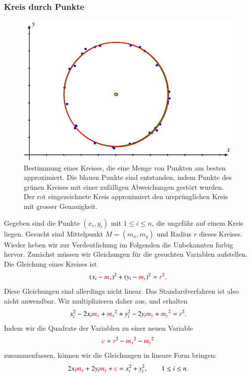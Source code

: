 \subsubsection{Kreis durch Punkte}
\begin{figure}
\centering
\includegraphics{4/images/kreis.pdf}
\caption{Bestimmung eines Kreises, die eine Menge von Punkten am besten
approximiert.
Die blauen Punkte sind entstanden, indem Punkte des grünen Kreises
mit einer zufälligen Abweichungen gestört wurden.
Der rot eingezeichnete Kreis approximiert den ursprünglichen
Kreis mit grosser Genauigkeit.
\label{skript:linreg-abb}}
\end{figure}
Gegeben sind die Punkte $(x_i,y_i)$ mit $1\le i\le n$, die ungefähr
auf einem Kreis liegen.
Gesucht sind Mittelpunkt $M=(m_x,m_y)$ und Radius $r$ dieses Kreises.
Wieder heben wir zur Verdeutlichung im Folgenden die Unbekannten farbig
hervor.
Zunächst müssen wir Gleichungen für die gesuchten Variablen aufstellen.
Die Gleichung eines Kreises ist
\[
(x_i - {\color{red}m_x})^2 + (y_i - {\color{red}m_y})^2 = {\color{red}r}^2.
\]
Diese Gleichungen sind allerdings nicht linear.
Das Standardverfahren ist also nicht anwendbar.
Wir multiplizieren daher aus, und erhalten
\[
x_i^2 - 2x_i {\color{red}m_x} + {\color{red}m_x}^2
+
y_i^2 - 2y_i {\color{red}m_y} + {\color{red}m_y}^2
=
{\color{red}r}^2.
\]
Indem wir die Quadrate der Variablen zu einer neuen Variable 
\[
{\color{red}c}
=
{\color{red}r}^2
-
{\color{red}m_x}^2
-
{\color{red}m_y}^2
\]
zusammenfassen, können wir die Gleichungen in lineare Form bringen:
\begin{equation}
2x_i{\color{red}m_x}
+
2y_i{\color{red}m_y}
+
{\color{red}c}
=
x_i^2+y_i^2,\qquad 1\le i\le n.
\end{equation}
